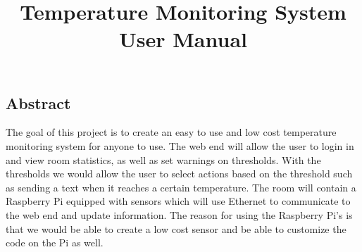 \documentclass{report}
\begin{document}
\title{Temperature Monitoring System User Manual}
\maketitle
\tableofcontents
\newpage
\subsection*{Abstract}
\Large The goal of this project is to create an easy to use and low cost temperature monitoring system for anyone to use. 
The web end will allow the user to login in and view room statistics, as well as set warnings on thresholds. 
With the thresholds we would allow the user to select actions based on the threshold such as sending a text when it reaches a certain temperature. 
The room will contain a Raspberry Pi equipped with sensors which will use Ethernet to communicate to the web end and update information. 
The reason for using the Raspberry Pi’s is that we would be able to create a low cost sensor and be able to customize the code on the Pi as well. 
\newpage
\end{document}
